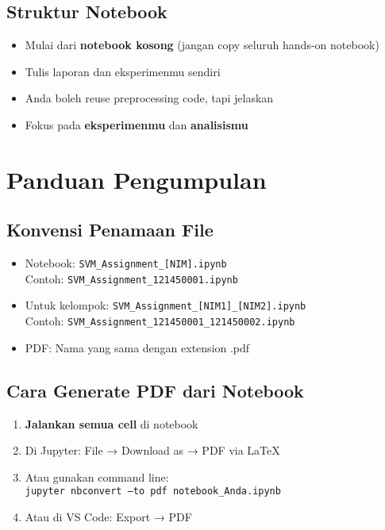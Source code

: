 \documentclass[12pt,a4paper]{article}
\begin{document}
\subsection{Struktur Notebook}
\begin{itemize}
    \item Mulai dari \textbf{notebook kosong} (jangan copy seluruh hands-on notebook)
    \item Tulis laporan dan eksperimenmu sendiri
    \item Anda boleh reuse preprocessing code, tapi jelaskan
    \item Fokus pada \textbf{eksperimenmu} dan \textbf{analisismu}
\end{itemize}

\section{Panduan Pengumpulan}

\subsection{Konvensi Penamaan File}
\begin{itemize}
    \item Notebook: \texttt{SVM\_Assignment\_[NIM].ipynb} \\
    Contoh: \texttt{SVM\_Assignment\_121450001.ipynb}
    \item Untuk kelompok: \texttt{SVM\_Assignment\_[NIM1]\_[NIM2].ipynb} \\
    Contoh: \texttt{SVM\_Assignment\_121450001\_121450002.ipynb}
    \item PDF: Nama yang sama dengan extension .pdf
\end{itemize}

\subsection{Cara Generate PDF dari Notebook}
\begin{enumerate}
    \item \textbf{Jalankan semua cell} di notebook
    \item Di Jupyter: File → Download as → PDF via LaTeX
    \item Atau gunakan command line: \\
    \texttt{jupyter nbconvert --to pdf notebook\_Anda.ipynb}
    \item Atau di VS Code: Export → PDF
\end{enumerate}
\end{document}
